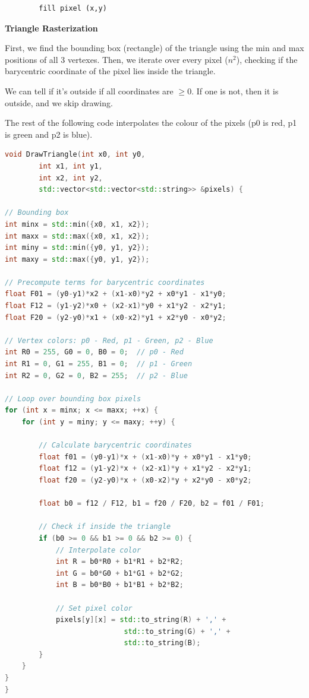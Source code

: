 \documentclass[letterpaper, 8pt]{extarticle}
\begin{document}
\begin{multicols*}{4}
\begin{lstlisting}
        fill pixel (x,y)
\end{lstlisting}

\textbf{Triangle Rasterization}

First, we find the bounding box (rectangle) of the triangle using the min and max positions of all 3 vertexes.
Then, we iterate over every pixel ($n^2$), checking if the barycentric coordinate of the pixel lies inside the triangle.

We can tell if it's outside if all coordinates are $\geq 0$. If one is not, then it is outside, and we skip drawing.

The rest of the following code interpolates the colour of the pixels (p0 is red, p1 is green and p2 is blue).


\begin{lstlisting}[language=C++]
void DrawTriangle(int x0, int y0, 
        int x1, int y1, 
        int x2, int y2, 
        std::vector<std::vector<std::string>> &pixels) {

// Bounding box
int minx = std::min({x0, x1, x2});
int maxx = std::max({x0, x1, x2});
int miny = std::min({y0, y1, y2});
int maxy = std::max({y0, y1, y2});

// Precompute terms for barycentric coordinates
float F01 = (y0-y1)*x2 + (x1-x0)*y2 + x0*y1 - x1*y0;
float F12 = (y1-y2)*x0 + (x2-x1)*y0 + x1*y2 - x2*y1;
float F20 = (y2-y0)*x1 + (x0-x2)*y1 + x2*y0 - x0*y2;

// Vertex colors: p0 - Red, p1 - Green, p2 - Blue
int R0 = 255, G0 = 0, B0 = 0;  // p0 - Red
int R1 = 0, G1 = 255, B1 = 0;  // p1 - Green
int R2 = 0, G2 = 0, B2 = 255;  // p2 - Blue

// Loop over bounding box pixels
for (int x = minx; x <= maxx; ++x) {
    for (int y = miny; y <= maxy; ++y) {

        // Calculate barycentric coordinates
        float f01 = (y0-y1)*x + (x1-x0)*y + x0*y1 - x1*y0;
        float f12 = (y1-y2)*x + (x2-x1)*y + x1*y2 - x2*y1;
        float f20 = (y2-y0)*x + (x0-x2)*y + x2*y0 - x0*y2;

        float b0 = f12 / F12, b1 = f20 / F20, b2 = f01 / F01;

        // Check if inside the triangle
        if (b0 >= 0 && b1 >= 0 && b2 >= 0) {
            // Interpolate color
            int R = b0*R0 + b1*R1 + b2*R2;
            int G = b0*G0 + b1*G1 + b2*G2;
            int B = b0*B0 + b1*B1 + b2*B2;

            // Set pixel color
            pixels[y][x] = std::to_string(R) + ',' +
                            std::to_string(G) + ',' +
                            std::to_string(B);
        }
    }
}
}
\end{lstlisting}


\end{multicols*}
\end{document}
